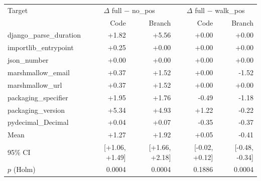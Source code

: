 \begin{tabular}{lrrrr}
\toprule
Target & \multicolumn{2}{c}{$\Delta$ full $-$ no\_pos} & \multicolumn{2}{c}{$\Delta$ full $-$ walk\_pos} \\
 & Code & Branch & Code & Branch \\
\midrule
django\_parse\_duration & +1.82 & +5.56 & +0.00 & +0.00 \\
importlib\_entrypoint & +0.25 & +0.00 & +0.00 & +0.00 \\
json\_number & +0.00 & +0.00 & +0.00 & +0.00 \\
marshmallow\_email & +0.37 & +1.52 & +0.00 & -1.52 \\
marshmallow\_url & +0.37 & +1.52 & +0.00 & +0.00 \\
packaging\_specifier & +1.95 & +1.76 & -0.49 & -1.18 \\
packaging\_version & +5.34 & +4.93 & +1.22 & -0.22 \\
pydecimal\_Decimal & +0.04 & +0.07 & -0.35 & -0.37 \\
\midrule
Mean & +1.27 & +1.92 & +0.05 & -0.41 \\
95\% CI & [+1.06, +1.49] & [+1.66, +2.18] & [-0.02, +0.12] & [-0.48, -0.34] \\
$p$ (Holm) & 0.0004 & 0.0004 & 0.1886 & 0.0004 \\
\bottomrule
\end{tabular}

